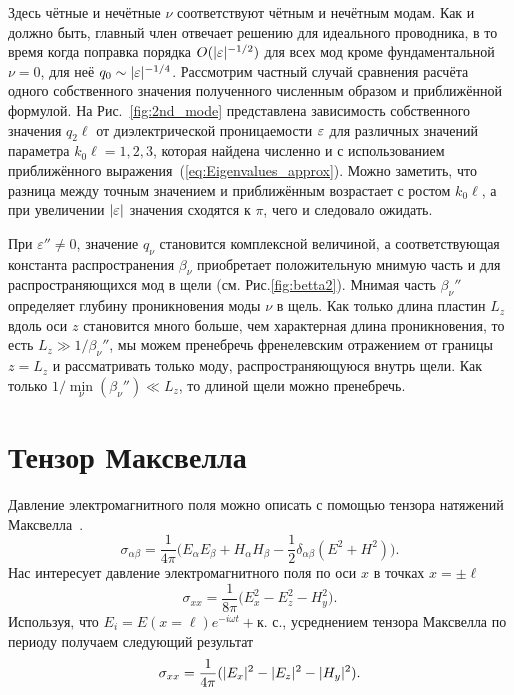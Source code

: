 Здесь чётные и нечётные $\nu$ соответствуют чётным и нечётным модам. Как и должно быть, главный член отвечает решению для идеального
проводника, в то время когда поправка порядка $O(\lvert\varepsilon\rvert^{-1/2})$ для всех мод кроме фундаментальной $\nu = 0$, для 
неё $q_0 \sim \lvert\varepsilon\rvert^{-1/4}$. Рассмотрим частный случай сравнения расчёта одного собственного значения
полученного численным образом и приближённой формулой. На Рис.~\ref{fig:2nd_mode} представлена зависимость собственного значения $q_2\ell$ от 
диэлектрической проницаемости  $\varepsilon$ для различных значений параметра $k_0 \ell = 1,2,3$, которая найдена численно и с использованием
приближённого выражения~(\ref{eq:Eigenvalues_approx}). Можно заметить, что разница между точным значением и приближённым возрастает с ростом 
 $k_0 \ell$, а при увеличении $\lvert\varepsilon\rvert$ значения сходятся к $\pi$, чего и следовало ожидать. 

 При $\varepsilon'' \neq 0$, значение $q_\nu$ становится комплексной величиной, а соответствующая константа 
 распространения $\beta_\nu$ приобретает положительную мнимую часть и для распространяющихся мод в щели (см. Рис.\ref{fig:betta2}). Мнимая часть $\beta_\nu''$ определяет
 глубину проникновения моды $\nu$ в щель. Как только длина пластин $L_z$ вдоль оси $z$ становится много больше, чем характерная длина проникновения, то 
 есть $L_z \gg 1/\beta_\nu''$, мы можем пренебречь френелевским отражением от границы $z = L_z$ и рассматривать только моду, распространяющуюся внутрь щели.  Как только $1/\min \limits_{\nu}(\beta_\nu'') \ll L_z$,
 то длиной щели можно пренебречь. 

\section{Тензор Максвелла}

Давление электромагнитного поля можно описать с помощью тензора натяжений Максвелла~\cite{landau}.  \begin{equation*}
    \sigma_{\alpha \beta} = \frac{1}{4 \pi}\Big( E_\alpha E_\beta + H_\alpha H_\beta - \frac{1}{2}\delta_{\alpha \beta}(E^2 + H^2) \Big).
\end{equation*} Нас интересует давление электромагнитного поля по оси $x$ в точках $x = \pm \ell$
\begin{equation*}
    \sigma_{xx} = \frac{1}{8 \pi}\Big( E_x^2 - E_z^2 - H_y^2\Big).
\end{equation*}
Используя, что $E_{i} = E(x = \ell)e^{-i \omega t} + \text{к. с.}$, усреднением тензора Максвелла по периоду получаем следующий результат
\begin{equation}
    \sigma_{xx} = \frac{1}{4 \pi} (\lvert E_x\rvert^2 -\lvert E_z\rvert^2 - \lvert H_y\rvert^2).
\end{equation}

